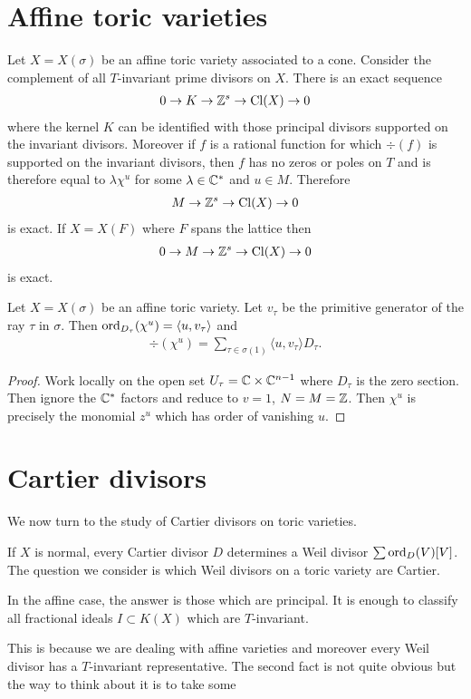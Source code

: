 \documentclass[12pt]{article}
\begin{document}
\section{Affine toric varieties}
Let $X = X(\sigma)$ be an affine toric variety associated to a cone.
Consider the complement of all $T$-invariant prime divisors on $X$.
There is an exact sequence \begin{align*}
    0 \to K \to \mathbb{Z}^s \to \operatorname{Cl}(X) \to 0
\end{align*} where the kernel $K$ can be identified with those principal divisors
supported on the invariant divisors. Moreover if $f$ is a rational function 
for which $\div(f)$ is supported on the invariant divisors, then $f$ has no zeros or poles
on $T$ and is therefore equal to $\lambda\chi^u$ for some $\lambda\in \mathbb{C}^*$ and $u\in M$.
Therefore \begin{align*}
    M \to \mathbb{Z}^s \to \operatorname{Cl}(X) \to 0
\end{align*} is exact. If $X = X(F)$ where $F$ spans the lattice then \begin{align*}
    0 \to M \to \mathbb{Z}^s \to \operatorname{Cl}(X) \to 0
\end{align*} is exact.

\begin{lemma}
    Let $X = X(\sigma)$ be an affine toric variety. Let $v_\tau$ 
    be the primitive generator of the ray $\tau$ in $\sigma$.
    Then $\operatorname{ord}_{D_\tau}(\chi^u) = \langle u, v_\tau\rangle$ and \begin{align*}
        \div(\chi^u) = \sum_{\tau\in \sigma(1)} \langle u, v_\tau\rangle D_\tau.
    \end{align*}
\end{lemma}

\begin{proof}
    Work locally on the open set $U_\tau = \mathbb{C}\times \mathbb{C}^{n-1}$ where $D_\tau$ is the zero section.
    Then ignore the $\mathbb{C}^*$ factors and reduce to $v=1$, $N = M = \mathbb{Z}$.
    Then $\chi^u$ is precisely the monomial $z^u$ which 
    has order of vanishing $u$.
\end{proof}

\section{Cartier divisors}
We now turn to the study of Cartier divisors on toric varieties.

If $X$ is normal, every Cartier divisor $D$ determines a Weil divisor $\sum \operatorname{ord}_D(V)[V]$.
The question we consider is which Weil divisors on a toric variety are Cartier.

\hfill

In the affine case, the answer is those which are principal. 
It is enough to classify all fractional ideals $I \subset K(X)$ which are $T$-invariant.

This is because we are dealing with affine varieties and 
moreover every Weil divisor has a $T$-invariant representative. The second fact is not quite 
obvious but the way to think about it is to take some 
\end{document}
